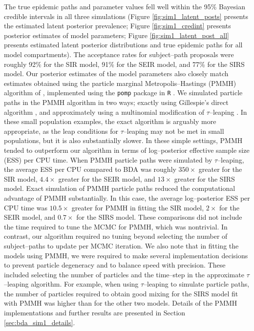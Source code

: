 The true epidemic paths and parameter values fell well within the 95\% Bayesian credible intervals in all three simulations (Figure \ref{fig:sim1_latent_posts} presents the estimated latent posterior prevalence; Figure \ref{fig:sim1_credint} presents posterior estimates of model parameters; Figure \ref{fig:sim1_latent_post_all} presents estimated latent posterior distributions and true epidemic paths for all model compartments). The acceptance rates for subject--path proposals were roughly 92\% for the SIR model, 91\% for the SEIR model, and 77\% for the SIRS model. Our posterior estimates of the model parameters also closely match estimates obtained using the particle marginal Metropolis--Hastings (PMMH) algorithm of \cite{andrieu2010particle}, implemented using the \texttt{pomp} package in \texttt{R} \cite{pomp}. We simulated particle paths in the PMMH algorithm in two ways; exactly using Gillespie's direct algorithm \cite{gillespie1976general}, and approximately using a multinomial modification of $ \tau $--leaping \cite{breto2011compound}. In these small population examples, the exact algorithm is arguably more appropriate, as the leap conditions for $ \tau $--leaping may not be met in small populations, but it is also substantially slower. In these simple settings, PMMH tended to outperform our algorithm in terms of log--posterior effective sample size (ESS) per CPU time. When PMMH particle paths were simulated by $ \tau $--leaping, the average ESS per CPU compared to BDA was roughly $ 350\times $ greater for the SIR model, $ 4.4\times $ greater for the SEIR model, and $ 13\times $ greater for the SIRS model. Exact simulation of PMMH particle paths reduced the computational advantage of PMMH substantially. In this case, the average log--posterior ESS per CPU time was $ 10.5\times $ greater for PMMH in fitting the SIR model, $ 2\times $ for the SEIR model, and $ 0.7\times $ for the SIRS model. These comparisons did not include the time required to tune the MCMC for PMMH, which was nontrivial. In contrast, our algorithm required no tuning beyond selecting the number of subject--paths to update per MCMC iteration. We also note that in fitting the models using PMMH, we were required to make several implementation decisions to prevent particle degeneracy and to balance speed with precision. These included selecting the number of particles and the time--step in the approximate $ \tau $--leaping algorithm. For example, when using $ \tau $--leaping to simulate particle paths, the number of particles required to obtain good mixing for the SIRS model fit with PMMH was higher than for the other two models. Details of the PMMH implementations and further results are presented in Section \ref{sec:bda_sim1_details}.

